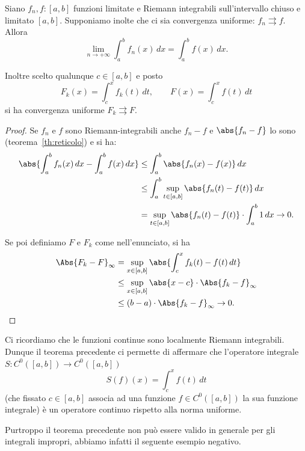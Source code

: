 \begin{theorem}%
  \label{th:scambio_limite_integrale}%
  \mymark{***}%
  Siano $f_n,f\colon [a,b]$ funzioni limitate 
  e Riemann integrabili sull'intervallo chiuso e limitato $[a,b]$.
  Supponiamo inolte che ci sia convergenza uniforme: 
  $f_n \rightrightarrows f$.
  Allora 
  \[
      \lim_{n\to+\infty} \int_a^b f_n(x)\, dx 
      = \int_a^b f(x)\, dx.
  \]

  Inoltre scelto qualunque $c\in [a,b]$ e posto
  \[
    F_k(x) = \int_{c}^x f_k(t)\, dt,
    \qquad
    F(x) = \int_{c}^x f(t)\, dt
  \]
  si ha convergenza uniforme $F_k \rightrightarrows F$.
\end{theorem}
\begin{proof}
  Se $f_n$ e $f$ sono Riemann-integrabili anche $f_n-f$ e $\abs{f_n-f}$ lo sono 
  (teorema~\ref{th:reticolo})
  e si ha:
  \begin{align*}
    \abs{\int_a^b f_n(x)\, dx - \int_a^b f(x)\, dx}
    &\le \int_a^b \abs{f_n(x)-f(x)}\, dx \\
    &\le \int_a^b \sup_{t\in[a,b]} \abs{f_n(t)-f(t)}\, dx \\
    &= \sup_{t\in [a,b]}\abs{f_n(t)-f(t)}\cdot \int_a^b 1\, dx
    \to 0.
  \end{align*}

  Se poi definiamo $F$ e $F_k$ come nell'enunciato, si ha
  \begin{align*}
  \Abs{F_k-F}_\infty
  &= \sup_{x\in [a,b]} \abs{\int_c^x f_k(t)-f(t)\, dt} \\
  &\le \sup_{x\in [a,b]} \abs{x-c} \cdot \Abs{f_k-f}_\infty \\
  &\le (b-a) \cdot \Abs{f_k-f}_\infty
  \to 0.
  \end{align*}
\end{proof}
  
Ci ricordiamo che le funzioni continue sono localmente Riemann integrabili.
Dunque il teorema precedente ci permette di affermare che l'operatore integrale 
$S\colon C^0([a,b]) \to C^0([a,b])$
\[
S(f)(x) = \int_{c}^x f(t)\, dt
\]
(che fissato $c \in [a,b]$ associa ad una funzione $f\in C^0([a,b])$ la sua funzione integrale) 
è un operatore continuo rispetto alla norma uniforme.

Purtroppo il teorema precedente non può essere valido in generale per gli integrali impropri,
abbiamo infatti il seguente esempio negativo.

